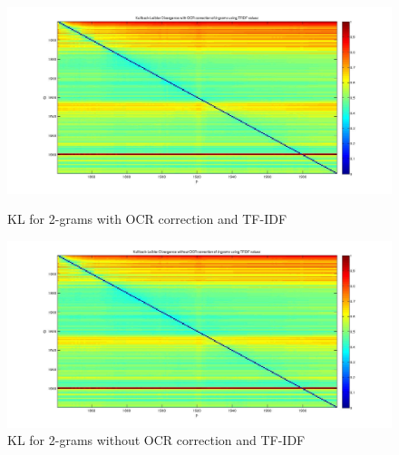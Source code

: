 \begin{figure}[h!]
    \begin{minipage}[b]{0.48\linewidth}
        \includegraphics[scale=0.15]{Pictures/kullback-leibler/KL_2-grams_with_correction_tfidf.jpg}
        \caption{KL for 2-grams with OCR correction and TF-IDF}
        \label{KL-TC2}
    \end{minipage}\hfill
    \begin{minipage}[b]{0.5\linewidth}
        \includegraphics[scale=0.15]{Pictures/kullback-leibler/KL_2-grams_without_correction_tfidf.jpg}
        \caption{KL for 2-grams without OCR correction and TF-IDF}
        \label{KL-TN2}
    \end{minipage}\hfill
\end{figure}


